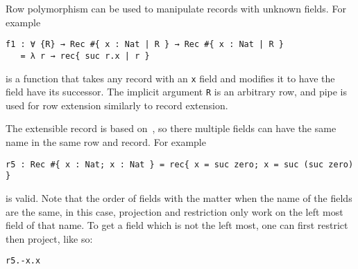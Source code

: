 Row polymorphism can be used to manipulate records with unknown fields. For
example
\begin{verbatim}
f1 : ∀ {R} → Rec #{ x : Nat | R } → Rec #{ x : Nat | R }
   = λ r → rec{ suc r.x | r }
\end{verbatim}
is a function that takes any record with an \texttt{x} field and modifies it to have the field have its successor. The
implicit argument \texttt{R} is an arbitrary row,
and pipe is used for row extension similarly to record extension.

The extensible record is based on~\cite{scopedlabels}, so there multiple fields
can have the same name in the same row and record. For example
\begin{verbatim}
r5 : Rec #{ x : Nat; x : Nat } = rec{ x = suc zero; x = suc (suc zero) }
\end{verbatim}
is valid. Note that the order of fields with the matter when the name of the
fields are the same, in this case, projection and restriction only work on the
left most field of that name. To get a field which is not the left most, one can first restrict then project, like so:
\begin{verbatim}
r5.-x.x
\end{verbatim}

